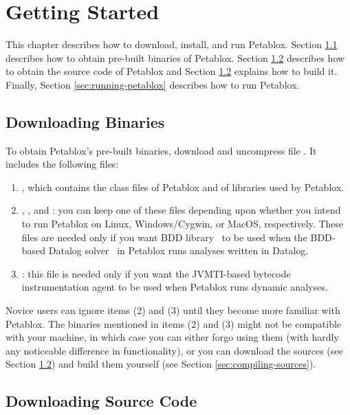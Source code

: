 \chapter{Getting Started}
\label{chap:start}

This chapter describes how to download, install, and run Petablox.  Section
\ref{sec:downloading-binaries} describes how to obtain pre-built binaries of
Petablox.  Section \ref{sec:downloading-sources} describes how to obtain the source
code of Petablox and Section \ref{sec:downloading-sources} explains how to build
it.  Finally, Section \ref{sec:running-petablox} describes how to run Petablox.

\section{Downloading Binaries}
\label{sec:downloading-binaries}

To obtain Petablox's pre-built binaries, download and uncompress file
\petabloxbinfile.  It includes the following files:

\begin{enumerate}
\item
{}, which contains the class files of Petablox and of libraries used
by Petablox.
\item
{}, , and : you can keep
one of these files depending upon whether you intend to run Petablox on Linux,
Windows/Cygwin, or MacOS, respectively.  These files are needed only if you want
BDD library \buddy\ to be used when the BDD-based Datalog solver \bddbddb\ in
Petablox runs analyses written in Datalog.
\item
{}: this file is needed only if you want the
JVMTI-based bytecode instrumentation agent to be used when Petablox runs dynamic
analyses.
\end{enumerate}

Novice users can ignore items (2) and (3) until they become more familiar with
Petablox.  The binaries mentioned in items (2) and (3) might not be compatible with
your machine, in which case you can either forgo using them (with hardly any
noticeable difference in functionality), or you can download the sources (see
Section \ref{sec:downloading-sources}) and build them yourself (see Section
\ref{sec:compiling-sources}).

\section{Downloading Source Code}
\label{sec:downloading-sources}

